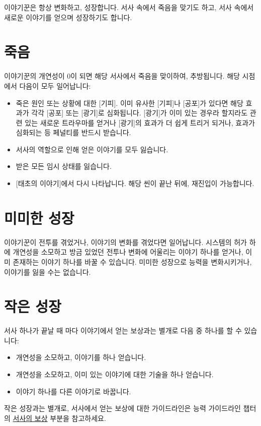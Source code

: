 \documentclass{report}
\begin{document}
	이야기꾼은 항상 변화하고, 성장합니다. 서사 속에서 죽음을 맞기도 하고, 서사 속에서 새로운 이야기를 얻으며 성장하기도 합니다.
	
	\section*{죽음}
	이야기꾼의 개연성이 0이 되면 해당 서사에서 죽음을 맞이하여, 추방됩니다. 해당 시점에서 다음이 모두 일어납니다:
	\begin{itemize}
		\item 죽은 원인 또는 상황에 대한 [기피]. 이미 유사한 [기피]나 [공포]가 있다면 해당 효과가 각각 [공포] 또는 [광기]로 심화됩니다. [광기]가 이미 있는 경우라 할지라도 관련 있는 새로운 트라우마를 얻거나 [광기]의 효과가 더 쉽게 트리거 되거나, 효과가 심화되는 등 페널티를 반드시 받습니다.
		\item 서사의 역할으로 인해 얻은 이야기를 모두 잃습니다.
		\item 받은 모든 임시 상태를 잃습니다.
		\item {}[태초의 이야기]에서 다시 나타납니다. 해당 씬이 끝난 뒤에, 재진입이 가능합니다.
	\end{itemize}
	
	\section*{미미한 성장}
	이야기꾼이 전투를 겪었거나, 이야기의 변화를 겪었다면 일어납니다. 시스템의 허가 하에 개연성을 소모하고 방금 있었던 전투나 변화에 어울리는 이야기 하나를 얻거나, 이미 존재하는 이야기 하나를 바꿀 수 있습니다. 미미한 성장으로 능력을 변화시키거나, 이야기를 잃을 수는 없습니다.
	
	\section*{작은 성장}
	서사 하나가 끝날 때 마다 이야기에서 얻는 보상과는 별개로 다음 중 하나를 할 수 있습니다:
	\begin{itemize}
		\item 개연성을 소모하고, 이야기를 하나 얻습니다.
		\item 개연성을 소모하고, 이미 있는 이야기에 대한 기술을 하나 얻습니다.
		\item 이야기 하나를 다른 이야기로 바꿉니다.
	\end{itemize}
	작은 성장과는 별개로, 서사에서 얻는 보상에 대한 가이드라인은 능력 가이드라인 챕터의 \hyperlink{reward}{서사의 보상} 부분을 참고하세요.
	
\end{document}
